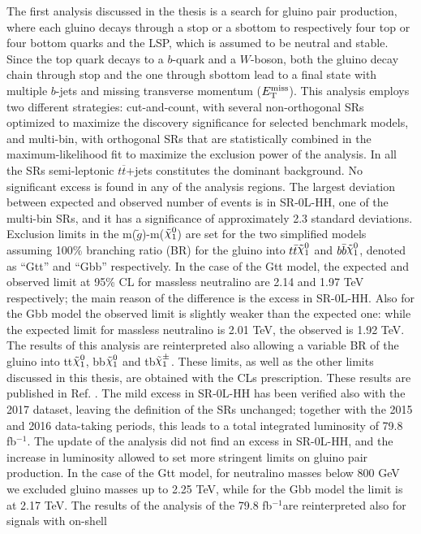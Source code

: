 \documentclass[11pt,a4paper]{article}
\def\ifb{\mbox{fb$^{-1}$}} %
\newcommand{\met}{\ensuremath{E_{\rm T}^{\mathrm{miss}}}\xspace}
\newcommand{\ttbar}{\ensuremath{t\overline{t}}\xspace}
\newcommand*{\gluino}{\ensuremath{\tilde{g}}\xspace}
\newcommand*{\ninoone}{\ensuremath{\mathchoice%
      {\displaystyle\raise.4ex\hbox{$\displaystyle\tilde\chi^0_1$}}%
         {\textstyle\raise.4ex\hbox{$\textstyle\tilde\chi^0_1$}}%
       {\scriptstyle\raise.3ex\hbox{$\scriptstyle\tilde\chi^0_1$}}%
 {\scriptscriptstyle\raise.3ex\hbox{$\scriptscriptstyle\tilde\chi^0_1$}}}\xspace}
\newcommand*{\chinoonepm}{\ensuremath{\mathchoice%
      {\displaystyle\raise.4ex\hbox{$\displaystyle\tilde\chi^\pm_1$}}%
         {\textstyle\raise.4ex\hbox{$\textstyle\tilde\chi^\pm_1$}}%
       {\scriptstyle\raise.3ex\hbox{$\scriptstyle\tilde\chi^\pm_1$}}%
 {\scriptscriptstyle\raise.3ex\hbox{$\scriptscriptstyle\tilde\chi^\pm_1$}}}\xspace}
\begin{document}
The first analysis discussed in the thesis is a search for gluino pair production, where each gluino decays through a stop or a sbottom 
to respectively four top or four bottom quarks and the LSP, which is assumed to be neutral and stable.
Since the top quark decays to a $b$-quark and a $W$-boson, both the gluino decay chain through stop and the one through sbottom lead to a 
final state with multiple $b$-jets and missing transverse momentum (\met). 
This analysis employs two different strategies: cut-and-count, with several non-orthogonal SRs optimized to 
maximize the discovery significance for selected benchmark models, and multi-bin, with orthogonal SRs 
that are statistically combined in the maximum-likelihood fit 
to maximize the exclusion power of the analysis. 
In all the SRs semi-leptonic \ttbar+jets constitutes the dominant background.
No significant excess is found in any of the analysis regions. 
The largest deviation between expected and observed number of events 
is in SR-0L-HH, one of the multi-bin SRs, and it has a significance of approximately 
2.3 standard deviations. 
Exclusion limits in the m(\gluino)-m(\ninoone) are set for the two simplified models assuming 
100\% branching ratio (BR) for the gluino into $t\bar{t}\ninoone$ and $b\bar{b}\ninoone$, denoted as ``Gtt'' and ``Gbb'' respectively.
In the case of the Gtt model, the expected and observed limit at 95\% CL for massless neutralino 
are 2.14 and 1.97 TeV respectively; the main reason of the difference is the excess in SR-0L-HH.
Also for the Gbb model the observed limit is slightly weaker than the expected one: 
while the expected limit for massless neutralino is 2.01 TeV, the observed is 1.92 TeV.
The results of this analysis are reinterpreted also allowing a variable BR of the gluino 
into tt\ninoone, bb\ninoone and tb\chinoonepm. 
These limits, as well as the other limits discussed in this thesis, are obtained with the CLs 
prescription. These results are published in Ref. \cite{Aaboud:2017hrg}. 
The mild excess in SR-0L-HH has been verified also with the 2017 dataset,
leaving the definition of the SRs unchanged; 
together with the 2015 and 2016 data-taking periods, this leads to a total integrated luminosity 
of 79.8 \ifb. 
The update of the analysis did not find an excess in SR-0L-HH, and the increase in luminosity 
allowed to set more stringent limits on gluino pair production. 
In the case of the Gtt model, for neutralino masses below 800 GeV we excluded gluino masses up to 
2.25 TeV, while for the Gbb model the limit is at 2.17 TeV. 
The results of the analysis of the 79.8 \ifb are reinterpreted also for signals with on-shell 
\end{document}
